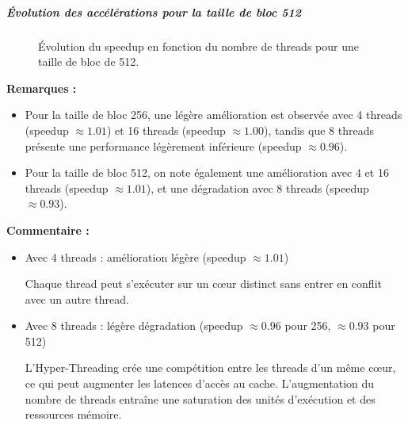 \documentclass[a4paper,13pt]{book}
\begin{document}
\subparagraph*{Évolution des accélérations pour la taille de bloc 512}

\begin{figure}[ht]
    \centering
    \caption{Évolution du speedup en fonction du nombre de threads pour une taille de bloc de 512.}
    \label{fig:speedup512}
\end{figure}

\textbf{Remarques :}
\begin{itemize}
    \item Pour la taille de bloc 256, une légère amélioration est observée avec 4 threads (speedup \(\approx 1.01\)) et 16 threads (speedup \(\approx 1.00\)), tandis que 8 threads présente une performance légèrement inférieure (speedup \(\approx 0.96\)).
    \item Pour la taille de bloc 512, on note également une amélioration avec 4 et 16 threads (speedup \(\approx 1.01\)), et une dégradation avec 8 threads (speedup \(\approx 0.93\)).
\end{itemize}
\textbf{Commentaire :}
\begin{itemize}
    \item Avec 4 threads : amélioration légère (speedup $\approx 1.01$)

    Chaque thread peut s'exécuter sur un c\oe ur distinct sans entrer en conflit avec un autre thread.

    \item Avec 8 threads : légère dégradation (speedup $\approx 0.96$ pour 256, $\approx 0.93$ pour 512)

    L'Hyper-Threading crée une compétition entre les threads d’un même c\oe ur, ce qui peut augmenter les latences d'accès au cache.
    L'augmentation du nombre de threads entraîne une saturation des unités d’exécution et des ressources mémoire.

\end{itemize}
\clearpage
\end{document}
